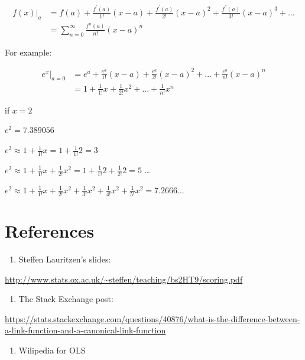 \documentclass[
]{book}
\providecommand{\tightlist}{%
  \setlength{\itemsep}{0pt}\setlength{\parskip}{0pt}}
\begin{document}
\[\begin{aligned}
f(x)|_{a} &=f(a)+\frac{f^{'}(a)}{1!}(x-a)+\frac{f^{'}(a)}{2!}(x-a)^2+\frac{f^{''}(a)}{3!}(x-a)^{3}+...\\&=\sum_{n=0}^{\infty} \frac{f^{n}(a)}{n!}(x-a)^n 
\end{aligned}\]

For example:

\[\begin{aligned} 
e^x |_{a=0} &= e^a+ \frac{e^a}{1!}(x-a)+\frac{e^a}{2!}(x-a)^2+...+\frac{e^a}{n!}(x-a)^n \\ 
&=  1+ \frac{1}{1!}x+\frac{1}{2!}x^2+...+\frac{1}{n!}x^n
\end{aligned}\]

if \(x=2\)

\(e^2 = 7.389056\)

\(e^2 \approx 1+\frac{1}{1!}x =1+\frac{1}{1!}2=3\)

\(e^2 \approx 1+\frac{1}{1!}x+\frac{1}{2!}x^2 =1+\frac{1}{1!}2 + \frac{1}{2!}2 =5\)
\ldots{}

\(e^2 \approx 1+\frac{1}{1!}x+\frac{1}{2!}x^2 +\frac{1}{3!}x^2+\frac{1}{4!}x^2+\frac{1}{5!}x^2=7.2666...\)

\hypertarget{references-1}{%
\section{References}\label{references-1}}

\begin{enumerate}
\def\labelenumi{\arabic{enumi}.}
\tightlist
\item
  Steffen Lauritzen's slides:
\end{enumerate}

\url{http://www.stats.ox.ac.uk/~steffen/teaching/bs2HT9/scoring.pdf}

\begin{enumerate}
\def\labelenumi{\arabic{enumi}.}
\setcounter{enumi}{1}
\tightlist
\item
  The Stack Exchange post:
\end{enumerate}

\url{https://stats.stackexchange.com/questions/40876/what-is-the-difference-between-a-link-function-and-a-canonical-link-function}

\begin{enumerate}
\def\labelenumi{\arabic{enumi}.}
\setcounter{enumi}{2}
\tightlist
\item
  Wilipedia for OLS
\end{enumerate}
\end{document}
